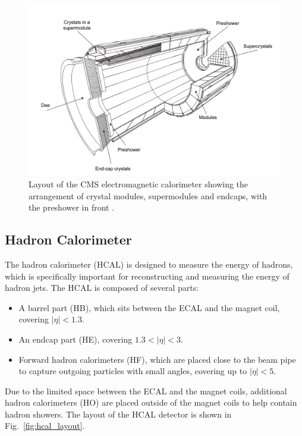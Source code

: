 \begin{figure}
    \begin{minipage}[t]{\linewidth}\centering
        \includegraphics[width=15cm]{ecal_layout.png}
    \end{minipage}
    \caption{Layout of the CMS electromagnetic calorimeter showing the arrangement of crystal
    modules, supermodules and endcaps, with the preshower in front \cite{cms:cms_experiment}.}
    \label{fig:ecal_layout}
\end{figure}


\subsection{Hadron Calorimeter}
\label{subsec:hcal}

The hadron calorimeter (HCAL) is designed to measure the energy of hadrons, which is specifically important for reconstructing and measuring the energy of
hadron jets. The HCAL is composed of several parts: 

\begin{itemize}
    \item A barrel part (HB), which sits between the ECAL and the magnet coil, covering $|\eta| < 1.3$. 
    \item An endcap part (HE), covering $1.3 < |\eta|< 3$.
    \item Forward hadron calorimeters (HF), which are placed close to the beam pipe to capture outgoing particles with small angles, covering up to $|\eta| < 5$.
\end{itemize}

Due to the limited space between the ECAL and the magnet coils, additional hadron calorimeters (HO) are placed outside of the magnet coils to help 
contain hadron showers. The layout of the HCAL detector is shown in Fig.~\ref{fig:hcal_layout}.

